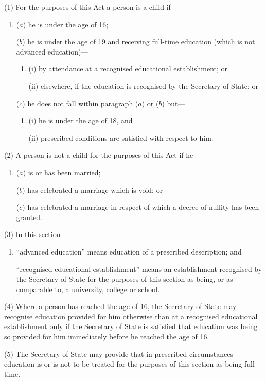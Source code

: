 \documentclass[12pt,a4paper]{article}
\begin{document}
(1) For the purposes of this Act a person is a child if—
\begin{enumerate}\item[]
($a$) he is under the age of 16;

($b$) he is under the age of 19 and receiving full-time education (which is not advanced education)—
\begin{enumerate}\item[]
(i) by attendance at a recognised educational establishment; or

(ii) elsewhere, if the education is recognised by the Secretary of State; or
\end{enumerate}

($c$) he does not fall within paragraph ($a$)  or ($b$)  but—
\begin{enumerate}\item[]
(i) he is under the age of 18, and

(ii) prescribed conditions are satisfied with respect to him.
\end{enumerate}
\end{enumerate}

(2) A person is not a child for the purposes of this Act if he—
\begin{enumerate}\item[]
($a$) is or has been married;

($b$) has celebrated a marriage which is void; or

($c$) has celebrated a marriage in respect of which a decree of nullity has been granted.
\end{enumerate}

(3) In this section—
\begin{enumerate}\item[]
    “advanced education” means education of a prescribed description; and

    “recognised educational establishment” means an establishment recognised by the Secretary of State for the purposes of this section as being, or as comparable to, a university, college or school. 
\end{enumerate}

(4) Where a person has reached the age of 16, the Secretary of State may recognise education provided for him otherwise than at a recognised educational establishment only if the Secretary of State is satisfied that education was being so provided for him immediately before he reached the age of 16.

(5) The Secretary of State may provide that in prescribed circumstances education is or is not to be treated for the purposes of this section as being full-time.
\end{document}
